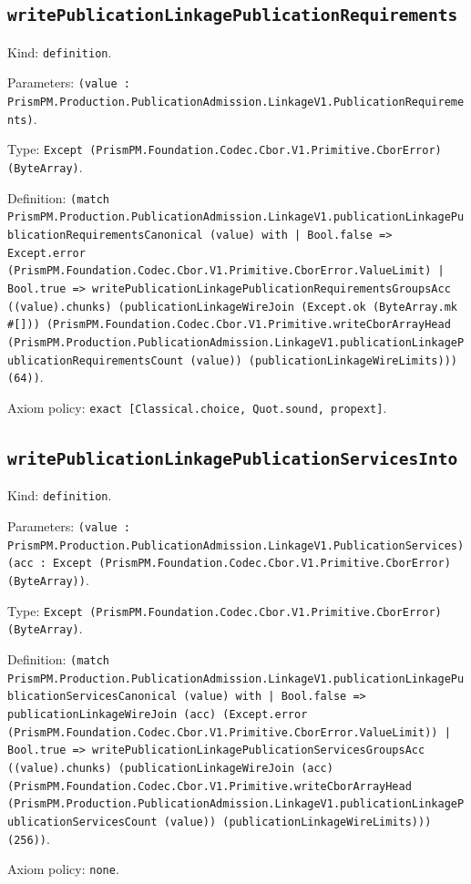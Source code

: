 \documentclass[11pt]{article}
\begin{document}
\subsection*{\texttt{writePublicationLinkagePublicationRequirements}}
\noindent Kind: \texttt{definition}.\par
\noindent Parameters: \texttt{(value : PrismPM.Production.PublicationAdmission.LinkageV1.PublicationRequirements)}.\par
\noindent Type: \texttt{Except (PrismPM.Foundation.Codec.Cbor.V1.Primitive.CborError) (ByteArray)}.\par
\noindent Definition: \texttt{(match PrismPM.Production.PublicationAdmission.LinkageV1.publicationLinkagePublicationRequirementsCanonical (value) with | Bool.false => Except.error (PrismPM.Foundation.Codec.Cbor.V1.Primitive.CborError.ValueLimit) | Bool.true => writePublicationLinkagePublicationRequirementsGroupsAcc ((value).chunks) (publicationLinkageWireJoin (Except.ok (ByteArray.mk \#[])) (PrismPM.Foundation.Codec.Cbor.V1.Primitive.writeCborArrayHead (PrismPM.Production.PublicationAdmission.LinkageV1.publicationLinkagePublicationRequirementsCount (value)) (publicationLinkageWireLimits))) (64))}.\par
\noindent Axiom policy: \texttt{exact [Classical.choice, Quot.sound, propext]}.\par
\subsection*{\texttt{writePublicationLinkagePublicationServicesInto}}
\noindent Kind: \texttt{definition}.\par
\noindent Parameters: \texttt{(value : PrismPM.Production.PublicationAdmission.LinkageV1.PublicationServices) (acc : Except (PrismPM.Foundation.Codec.Cbor.V1.Primitive.CborError) (ByteArray))}.\par
\noindent Type: \texttt{Except (PrismPM.Foundation.Codec.Cbor.V1.Primitive.CborError) (ByteArray)}.\par
\noindent Definition: \texttt{(match PrismPM.Production.PublicationAdmission.LinkageV1.publicationLinkagePublicationServicesCanonical (value) with | Bool.false => publicationLinkageWireJoin (acc) (Except.error (PrismPM.Foundation.Codec.Cbor.V1.Primitive.CborError.ValueLimit)) | Bool.true => writePublicationLinkagePublicationServicesGroupsAcc ((value).chunks) (publicationLinkageWireJoin (acc) (PrismPM.Foundation.Codec.Cbor.V1.Primitive.writeCborArrayHead (PrismPM.Production.PublicationAdmission.LinkageV1.publicationLinkagePublicationServicesCount (value)) (publicationLinkageWireLimits))) (256))}.\par
\noindent Axiom policy: \texttt{none}.\par
\end{document}
